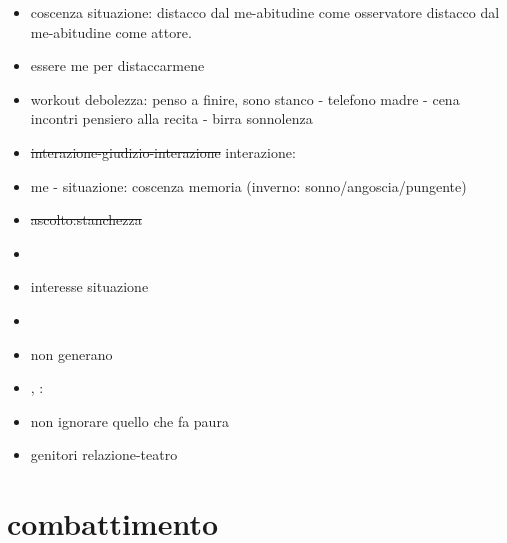 \begin{itemize}
\item coscenza situazione: distacco dal me-abitudine come osservatore distacco dal me-abitudine come attore.
\item essere me per distaccarmene
\item workout debolezza: penso a finire, sono stanco - telefono madre  - cena incontri pensiero alla recita - birra sonnolenza 
\item \sout{interazione-giudizio-interazione} interazione: 
\item me - situazione: coscenza memoria (inverno: sonno/angoscia/pungente)
\item \sout{ascolto:stanchezza} 
\item {}
\item {} interesse situazione
\item {}
\item {} non generano 
\item {}, : 
\item non ignorare quello che fa paura
\item genitori relazione-teatro
\end{itemize}

\section{combattimento}

